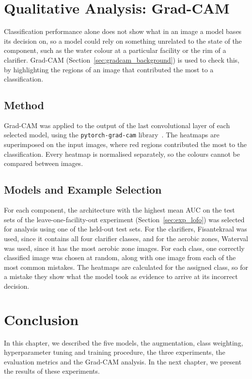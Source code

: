 \section{Qualitative Analysis: Grad-CAM}
\label{sec:exp_gradcam}

Classification performance alone does not show what in an image a model bases its decision on, so a model could rely on something unrelated to the state of the component, such as the water colour at a particular facility or the rim of a clarifier. Grad-CAM (Section~\ref{sec:gradcam_background}) is used to check this, by highlighting the regions of an image that contributed the most to a classification.

\subsection{Method}
\label{subsec:gradcam_method}

Grad-CAM was applied to the output of the last convolutional layer of each selected model, using the \texttt{pytorch-grad-cam} library~\citep{gildenblat2021pytorchcam}. The heatmaps are superimposed on the input images, where red regions contributed the most to the classification. Every heatmap is normalised separately, so the colours cannot be compared between images.

\subsection{Models and Example Selection}
\label{subsec:gradcam_setup}

For each component, the architecture with the highest mean AUC on the test sets of the leave-one-facility-out experiment (Section~\ref{sec:exp_lofo}) was selected for analysis using one of the held-out test sets. For the clarifiers, Fisantekraal was used, since it contains all four clarifier classes, and for the aerobic zones, Waterval was used, since it has the most aerobic zone images. For each class, one correctly classified image was chosen at random, along with one image from each of the most common mistakes. The heatmaps are calculated for the assigned class, so for a mistake they show what the model took as evidence to arrive at its incorrect decision.

\section{Conclusion}\label{sec:exp_conclusion}

In this chapter, we described the five models, the augmentation, class weighting, hyperparameter tuning and training procedure, the three experiments, the evaluation metrics and the Grad-CAM analysis. In the next chapter, we present the results of these experiments.
